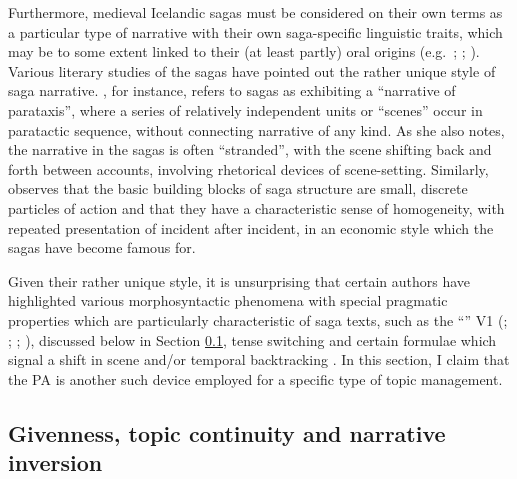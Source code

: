 \documentclass[output=paper,colorlinks,citecolor=brown]{langscibook}
\begin{document}
Furthermore, medieval Icelandic sagas must be considered on their own terms as a particular type of narrative with their own saga-specific linguistic traits, which may be to some extent linked to their (at least partly) oral origins (e.g.~\citealp{byock1984saga}; \citealp{quinn2000orality}; \citealp{sigurdhsson2007orality}). Various literary studies of the sagas have pointed out the rather unique style of saga narrative. \citet{clover1974scene}, for instance, refers to sagas as exhibiting a ``narrative of parataxis'', where a series of relatively independent units or ``scenes'' occur in paratactic sequence, without connecting narrative of any kind. As she also notes, the narrative in the sagas is often ``stranded'', with the scene shifting back and forth between accounts, involving rhetorical devices of scene-setting. Similarly, \citet{byock1994narrating} observes that the basic building blocks of saga structure are small, discrete particles of action and that they have a characteristic sense of homogeneity, with repeated presentation of incident after incident, in an economic style which the sagas have become famous for. 

Given their rather unique style, it is unsurprising that certain authors have highlighted various morphosyntactic phenomena with special pragmatic properties which are particularly characteristic of saga texts, such as the ``'' V1   (\citealp{kossuth1980-narrative-syntax}; \citealp{Platzack1985}; \citealp{hopper1987}; \citealp{booth-beck2021jhs}), discussed below in Section \ref{subsect:cont-ni}, tense switching \citep{richardson1995tense} and certain formulae which signal a shift in scene and/or temporal backtracking \citep{clover1974scene}. In this section, I claim that the PA is another such device employed for a specific type of topic management.

\subsection{Givenness, topic continuity and narrative inversion}\label{subsect:cont-ni}
\end{document}
